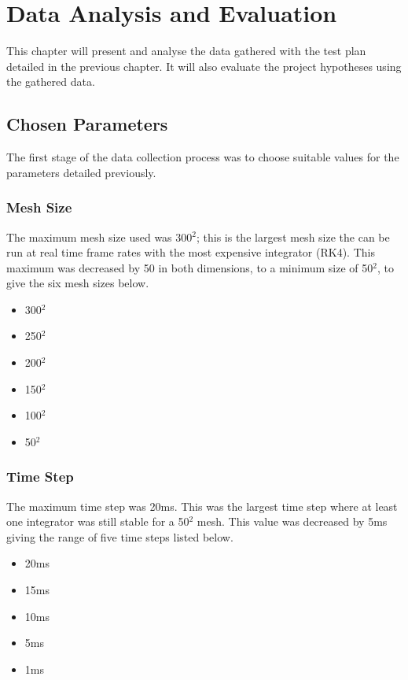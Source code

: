 \chapter{Data Analysis and Evaluation}
\label{sec:eval}

This chapter will present and analyse the data gathered with the test plan detailed in the previous chapter. It will also evaluate the project hypotheses using the gathered data.

\section{Chosen Parameters}
The first stage of the data collection process was to choose suitable values for the parameters detailed previously.

\subsection{Mesh Size}
The maximum mesh size used was 300$^{2}$; this is the largest mesh size the can be run at real time frame rates with the most expensive integrator (RK4). This maximum was decreased by 50 in both dimensions, to a minimum size of 50$^{2}$, to give the six mesh sizes below.
\begin{itemize}
\item{300$^{2}$}
\item{250$^{2}$}
\item{200$^{2}$}
\item{150$^{2}$}
\item{100$^{2}$}
\item{50$^{2}$}
\end{itemize}

\subsection{Time Step}
The maximum time step was 20ms. This was the largest time step where at least one integrator was still stable for a 50$^{2}$ mesh. This value was decreased by 5ms giving the range of five time steps listed below.
\begin{itemize}
\item{20ms}
\item{15ms}
\item{10ms}
\item{5ms}
\item{1ms}
\end{itemize}

